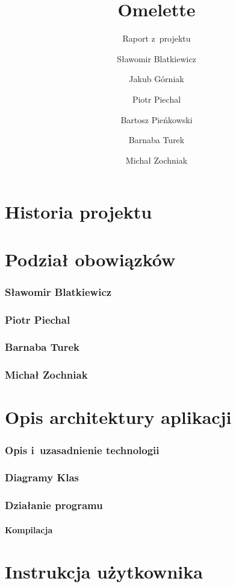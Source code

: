 \documentclass[a4paper]{scrartcl}
\begin{document}
\sloppy

\title{Omelette}
\subtitle{Raport z~projektu}
\author{
  Sławomir Blatkiewicz\and
  Jakub Górniak       \and
  Piotr Piechal       \and
  Bartosz Pieńkowski  \and
  Barnaba Turek       \and
  Michał Zochniak
}
\maketitle

\part{Historia projektu}
	
	

\part{Podział obowiązków}
	\section{Sławomir Blatkiewicz}
		
	\section{Piotr Piechal}
		
	\section{Barnaba Turek}
		
	\section{Michał Zochniak}
		

\part{Opis architektury aplikacji}
  \section{Opis i~uzasadnienie technologii}
    
  \section{Diagramy Klas}
    
  \section{Działanie programu}
    \subsection{Kompilacja}
      

\part{Instrukcja użytkownika}
	
	
\end{document}
